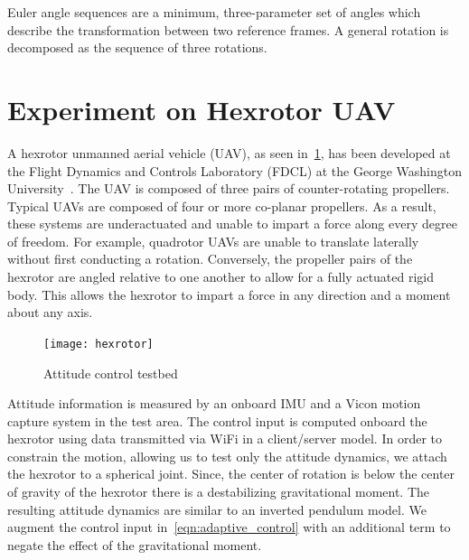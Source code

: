 \documentclass[fleqn]{IJCAS}  %
\begin{document}
\begin{multicols}{2}
Euler angle sequences are a minimum, three-parameter set of angles which describe the transformation between two reference frames.
A general rotation is decomposed as the sequence of three rotations. 


\section{Experiment on Hexrotor UAV}

A hexrotor unmanned aerial vehicle (UAV), as seen in~\cref{fig:hexrotor}, has been developed at the Flight Dynamics and Controls Laboratory (FDCL) at the George Washington University~\cite{kaufman2014}.
The UAV is composed of three pairs of counter-rotating propellers. 
Typical UAVs are composed of four or more co-planar propellers.
As a result, these systems are underactuated and unable to impart a force along every degree of freedom.
For example, quadrotor UAVs are unable to translate laterally without first conducting a rotation.
Conversely, the propeller pairs of the hexrotor are angled relative to one another to allow for a fully actuated rigid body.
This allows the hexrotor to impart a force in any direction and a moment about any axis. 

\begin{figure}[H]
    \centering
    \texttt{[image: hexrotor]}
    \caption{Attitude control testbed~\label{fig:hexrotor}}
\end{figure}
Attitude information is measured by an onboard IMU and a Vicon motion capture system in the test area.
The control input is computed onboard the hexrotor using data transmitted via WiFi in a client/server model.
In order to constrain the motion, allowing us to test only the attitude dynamics, we attach the hexrotor to a spherical joint.
Since, the center of rotation is below the center of gravity of the hexrotor there is a destabilizing gravitational moment.
The resulting attitude dynamics are similar to an inverted pendulum model.
We augment the control input in~\cref{eqn:adaptive_control} with an additional term to negate the effect of the gravitational moment.


\end{multicols}
\end{document}
